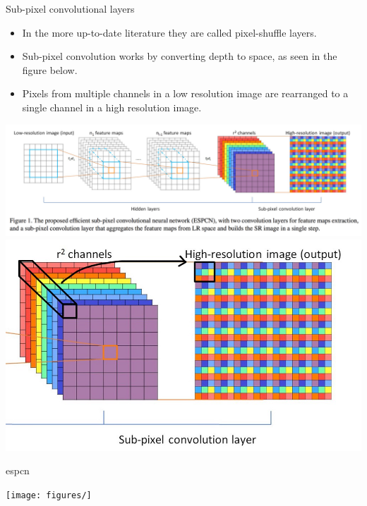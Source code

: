 \documentclass[hyperref={unicode}, xcolor=dvipsnames, t]{beamer}
\begin{document}
\begin{frame}{Sub-pixel convolutional layers}
    \begin{itemize}
        \item In the more up-to-date literature they are called pixel-shuffle layers.
        \item Sub-pixel convolution works by converting depth to space, as seen in the figure below. 
        \item Pixels from multiple channels in a low resolution image are rearranged to a single channel in a high resolution image. 
    \end{itemize}
    \begin{center}
     {
        \includegraphics[width=\linewidth]{figures/sub-pixel.png}
    }
     {
        \includegraphics[width=0.8\linewidth]{figures/sub-pixel-detail.jpeg}
    }
    \end{center}
\end{frame}

\begin{frame}{\texorpdfstring{\gls{espcn}}{Lg}}
    \begin{center}
        \texttt{[image: figures/]}
    \end{center}    
\end{frame}
\end{document}
